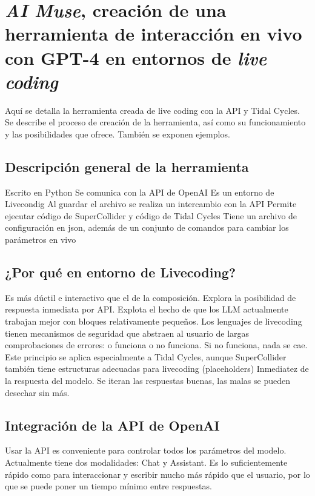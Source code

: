 \chapter{\textit{AI Muse}, creación de una herramienta de interacción en vivo con GPT-4 en entornos de \textit{live coding}}


Aquí se detalla la herramienta creada de live coding con la API y Tidal Cycles. Se describe el proceso de creación de la herramienta, así como su funcionamiento y las posibilidades que ofrece. También se exponen ejemplos.

\section{Descripción general de la herramienta}

Escrito en Python
Se comunica con la API de OpenAI
Es un entorno de Livecondig
Al guardar el archivo se realiza un intercambio con la API
Permite ejecutar código de SuperCollider y código de Tidal Cycles
Tiene un archivo de configuración en json, además de un conjunto de comandos para cambiar los parámetros en vivo

\section{¿Por qué en entorno de Livecoding?}

Es más dúctil e interactivo que el de la composición.
Explora la posibilidad de respuesta inmediata por API.
Explota el hecho de que los LLM actualmente trabajan mejor con bloques relativamente pequeños.
Los lenguajes de livecoding tienen mecanismos de seguridad que abstraen al usuario de largas comprobaciones de errores: o funciona o no funciona. Si no funciona, nada se cae. Este principio se aplica especialmente a Tidal Cycles, aunque SuperCollider también tiene estructuras adecuadas para livecoding (placeholders)
Inmediatez de la respuesta del modelo. Se iteran las respuestas buenas, las malas se pueden desechar sin más.

\section{Integración de la API de OpenAI}

Usar la API es conveniente para controlar todos los parámetros del modelo.
Actualmente tiene dos modalidades: Chat y Assistant.
Es lo suficientemente rápido como para interaccionar y escribir mucho más rápido que el usuario, por lo que se puede poner un tiempo mínimo entre respuestas.



